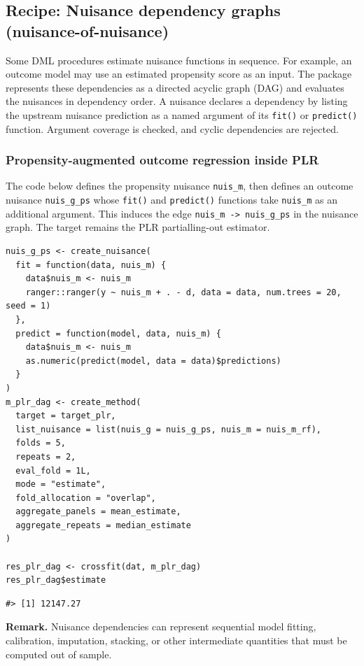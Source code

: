 \subsection{Recipe: Nuisance dependency graphs (nuisance-of-nuisance)}\label{app:dag}

Some DML procedures estimate nuisance functions in sequence. For example, an outcome model may use an estimated propensity score as an input. The package represents these dependencies as a directed acyclic graph (DAG) and evaluates the nuisances in dependency order. A nuisance declares a dependency by listing the upstream nuisance prediction as a named argument of its \texttt{fit()} or \texttt{predict()} function. Argument coverage is checked, and cyclic dependencies are rejected.

\subsubsection{Propensity-augmented outcome regression inside PLR}\label{propensity-augmented-outcome-regression-inside-plr}

The code below defines the propensity nuisance \texttt{nuis\_m}, then defines an outcome nuisance \texttt{nuis\_g\_ps} whose \texttt{fit()} and \texttt{predict()} functions take \texttt{nuis\_m} as an additional argument. This induces the edge \texttt{nuis\_m\ -\textgreater{}\ nuis\_g\_ps} in the nuisance graph. The target remains the PLR partialling-out estimator.

\begin{verbatim}
nuis_g_ps <- create_nuisance(
  fit = function(data, nuis_m) {
    data$nuis_m <- nuis_m
    ranger::ranger(y ~ nuis_m + . - d, data = data, num.trees = 20, seed = 1)
  },
  predict = function(model, data, nuis_m) {
    data$nuis_m <- nuis_m
    as.numeric(predict(model, data = data)$predictions)
  }
)
m_plr_dag <- create_method(
  target = target_plr,
  list_nuisance = list(nuis_g = nuis_g_ps, nuis_m = nuis_m_rf),
  folds = 5,
  repeats = 2,
  eval_fold = 1L,
  mode = "estimate",
  fold_allocation = "overlap",
  aggregate_panels = mean_estimate,
  aggregate_repeats = median_estimate
)

res_plr_dag <- crossfit(dat, m_plr_dag)
res_plr_dag$estimate
\end{verbatim}

\begin{verbatim}
#> [1] 12147.27
\end{verbatim}

\textbf{Remark.} Nuisance dependencies can represent sequential model fitting, calibration, imputation, stacking, or other intermediate quantities that must be computed out of sample.

